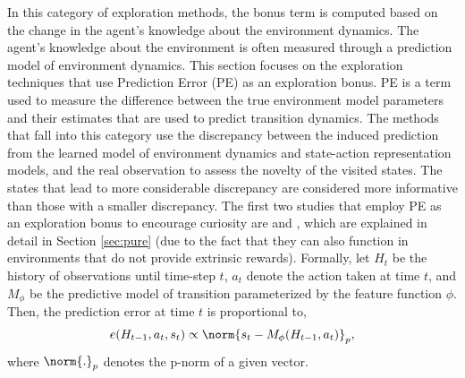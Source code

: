 In this category of exploration methods, the bonus term is computed based on the change in the agent's knowledge about the environment dynamics. The agent's knowledge about the environment is often measured through a prediction model of environment dynamics. This section focuses on the exploration techniques that use Prediction Error (PE) as an exploration bonus. PE is a term used to measure the difference between the true environment model parameters and their estimates that are used to predict transition dynamics. The methods that fall into this category use the discrepancy between the induced prediction from the learned model of environment dynamics and state-action representation models, and the real observation to assess the novelty of the visited states. The states that lead to more considerable discrepancy are considered more informative than those with a smaller discrepancy. The first two studies that employ PE as an exploration bonus to encourage curiosity are  and , which are explained in detail in Section \ref{sec:pure} (due to the fact that they can also function in environments that do not provide extrinsic rewards).
Formally, let $H_t$ be the history of observations until time-step $t$, $a_t$ denote the action taken at time $t$, and $M_\phi$ be the predictive model of transition parameterized by the feature function $\phi$. Then, the prediction error at time $t$ is proportional to, 
\begin{align}
    e(H_{t-1},a_t,s_{t}) \propto \norm{s_{t} - M_\phi(H_{t-1},a_t)}_p,
\end{align}
where $\norm{.}_p$ denotes the p-norm of a given vector.
